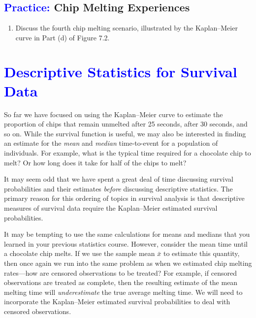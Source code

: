 \documentclass[
]{report}
\providecommand{\tightlist}{%
  \setlength{\itemsep}{0pt}\setlength{\parskip}{0pt}}
\begin{document}
\hypertarget{chip-melting-experiences}{%
\subsection*{\texorpdfstring{\textcolor{blue}{Practice:} Chip Melting Experiences}{ Chip Melting Experiences}}\label{chip-melting-experiences}}

\begin{enumerate}
\def\labelenumi{\arabic{enumi}.}
\setcounter{enumi}{19}
\tightlist
\item
  Discuss the fourth chip melting scenario, illustrated by the Kaplan--Meier curve in Part (d) of Figure 7.2.
\end{enumerate}

\hypertarget{section-80}{%
\section{\texorpdfstring{\textcolor{blue}{Descriptive Statistics for Survival Data}}{}}\label{section-80}}

So far we have focused on using the Kaplan--Meier curve to estimate the proportion of chips that remain unmelted after 25 seconds, after 30 seconds, and so on. While the survival function is useful, we may also be interested in finding an estimate for the \emph{mean} and \emph{median} time-to-event for a population of individuals. For example, what is the typical time required for a chocolate chip to melt? Or how long does it take for half of the chips to melt?

It may seem odd that we have spent a great deal of time discussing survival probabilities and their estimates \emph{before} discussing descriptive statistics. The primary reason for this ordering of topics in survival analysis is that descriptive measures of survival data require the Kaplan--Meier estimated survival probabilities.

It may be tempting to use the same calculations for means and medians that you learned in your previous statistics course. However, consider the mean time until a chocolate chip melts. If we use the sample mean \(\scriptstyle \bar x\) to estimate this quantity, then once again we run into the same problem as when we estimated chip melting rates---how are censored observations to be treated? For example, if censored observations are treated as complete, then the resulting estimate of the mean melting time will \emph{underestimate} the true average melting time. We will need to incorporate the Kaplan--Meier estimated survival probabilities to deal with censored observations.
\end{document}
